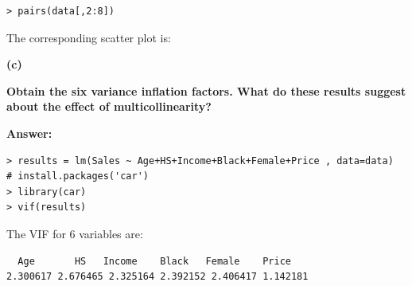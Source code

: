 \documentclass[letterpaper,11pt]{article}
\begin{document}
\begin{lstlisting}
> pairs(data[,2:8])
\end{lstlisting}

The corresponding scatter plot is:
\begin{center} 
\end{center}

\begin{addmargin}[-1.1em]{0em}
  \textbf{(c)}\par
\end{addmargin}
\textbf{Obtain the six variance inflation factors. What do these results suggest about the effect of multicollinearity?}\par
\bigbreak
\begin{addmargin}[-0.5em]{0em}
  \textbf{Answer: }
\end{addmargin}

\begin{lstlisting}
> results = lm(Sales ~ Age+HS+Income+Black+Female+Price , data=data)
# install.packages('car')
> library(car)
> vif(results)
\end{lstlisting}
The VIF for 6 variables are:
\begin{lstlisting}
  Age       HS   Income    Black   Female    Price
2.300617 2.676465 2.325164 2.392152 2.406417 1.142181
\end{lstlisting}
\end{document}
